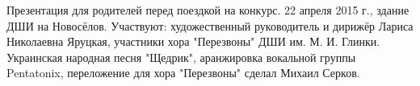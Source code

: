  
 
 
 
 


Презентация для родителей перед поездкой на конкурс. 
22 апреля 2015 г., здание ДШИ на Новосёлов. Участвуют: художественный руководитель и дирижёр Лариса Николаевна Яруцкая, участники хора "Перезвоны" ДШИ им. М. И. Глинки.
Украинская народная песня "Щедрик", аранжировка вокальной группы Pentatonix, переложение для хора "Перезвоны" сделал Михаил Серков.











